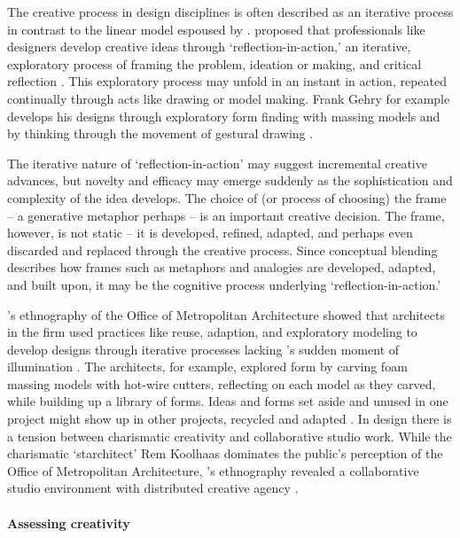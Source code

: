 \documentclass{article}
\begin{document}
The creative process in design disciplines is often described as an iterative process 
in contrast to the linear model espoused by \citeauthor{Wallas1926}. 
%
\citeauthor{Schon1983} proposed that 
professionals like designers develop creative ideas through `reflection-in-action,' 
an iterative, exploratory process 
of framing the problem, ideation or making, and critical reflection \citeyearpar{Schon1983}.
This exploratory process may unfold in an instant in action, 
repeated continually through acts like drawing or model making. 
%
Frank Gehry for example develops his designs through exploratory form finding with massing models
and by thinking through the movement of gestural drawing
\citep{Gehry2004,Pollack2006}.
%

%
The iterative nature of `reflection-in-action' 
may suggest incremental creative advances, but 
novelty and efficacy may emerge suddenly
as the sophistication and complexity of the idea develops. 
The choice of (or process of choosing) the frame -- a generative metaphor perhaps -- is an important creative decision.
%
The frame, however, is not static -- it is developed, refined, adapted, and perhaps even discarded and replaced through the creative process.
Since conceptual blending describes how frames such as metaphors and analogies 
are developed, adapted, and built upon, 
it may be the cognitive process underlying `reflection-in-action.' 
%

\citeauthor{Yaneva2009}'s ethnography of the Office of Metropolitan Architecture
showed that architects in the firm used practices like reuse, adaption, and exploratory modeling
to develop designs through iterative processes lacking \citeauthor{Wallas1926}'s sudden moment of illumination \citeyearpar{Yaneva2009}. 
The architects, for example, explored form by carving foam massing models with hot-wire cutters, reflecting on each model as they carved, while building up a library of forms. Ideas and forms set aside and unused in one project might show up in other projects, recycled and adapted \citep{Yaneva2009}.
%
In design there is a tension between charismatic creativity and collaborative studio work. 
%
While the charismatic `starchitect' Rem Koolhaas dominates the public's perception of the Office of Metropolitan Architecture, 
\citeauthor{Yaneva2009}'s ethnography revealed a collaborative studio environment with distributed creative agency \citeyearpar{Yaneva2009}. 

\paragraph{Assessing creativity}
\end{document}

